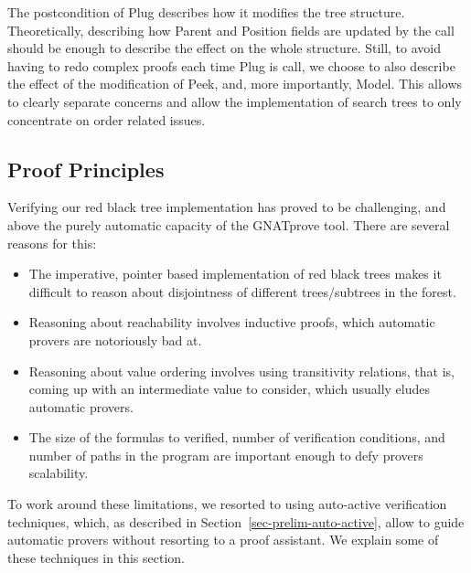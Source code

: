 \documentclass[11pt,a4paper]{article}
\begin{document}
The postcondition of Plug describes how it modifies the tree structure. Theoretically,
describing how Parent and Position fields are updated by the call should be enough to
describe the effect on the whole structure. Still, to avoid having to redo complex
proofs each time Plug is call, we choose to also describe the effect of the modification
of Peek, and, more importantly, Model. This allows to clearly separate concerns and allow
the implementation of search trees to only concentrate on order related issues.

\subsection{Proof Principles}


Verifying our red black tree implementation has proved to be challenging, and above the
purely automatic capacity of the GNATprove tool. There are several reasons for this:

\begin{itemize}
 \item The imperative, pointer based implementation of red black trees makes it difficult
 to reason about disjointness of different trees/subtrees in the forest.
 \item Reasoning about reachability involves inductive proofs, which automatic provers are
 notoriously bad at.
 \item Reasoning about value ordering involves using transitivity relations, that is, coming
 up with an intermediate value to consider, which usually eludes automatic provers.
 \item The size of the formulas to verified, number of verification conditions, and number of
 paths in the program are important enough to defy provers scalability.
\end{itemize}

To work around these limitations, we resorted to using auto-active verification techniques, which,
as described in Section~\ref{sec-prelim-auto-active}, allow to guide automatic provers without
resorting to a proof assistant. We explain some of these techniques in this section.
\end{document}
